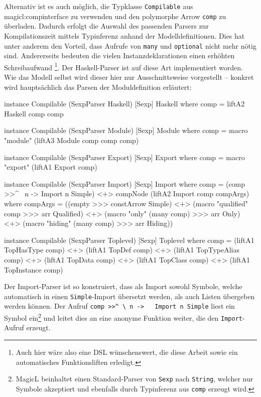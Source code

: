 \documentclass[11pt, a4paper, bibgerm]{scrbook}
\newenvironment{DIFnomarkup}{}{}
\newcommand\icode[1]{\lstinline?#1?}
\newcommand\sref{}
\begin{document}
Alternativ ist es auch möglich, die Typklasse \icode{Compilable} aus
\sref{magicl:compinterface} zu verwenden und den polymorphe
Arrow \icode{comp} zu überladen. Dadurch erfolgt die Auswahl des
passenden Parsers zur Kompilationszeit mittels Typinferenz anhand der
Modelldefinitionen. Dies hat unter anderem den Vorteil, dass Aufrufe von
\icode{many} und \icode{optional} nicht mehr nötig sind. Andererseits
bedeuten die vielen Instanzdeklarationen einen erhöhten Schreibaufwand
\footnote{Auch hier wäre also eine DSL wünschenswert, die diese Arbeit
  sowie ein automatisches Funktionsliften erledigt.}. Der Haskell-Parser
ist auf diese Art implementiert worden. Wie das Modell selbst wird
dieser hier nur Ausschnittsweise vorgestellt -- konkret wird
hauptsächlich das Parsen der Moduldefinition erläutert:
\begin{DIFnomarkup}\begin{code}
instance Compilable (SexpParser Haskell) [Sexp] Haskell where
    comp = liftA2 Haskell comp comp

instance Compilable (SexpParser Module) [Sexp] Module where
    comp = macro "module" (liftA3 Module comp comp comp)

instance Compilable (SexpParser Export) [Sexp] Export where
    comp = macro "export" (liftA1 Export comp)

instance Compilable (SexpParser Import) [Sexp] Import where
    comp  = (comp >>^ \ n -> Import n Simple) <+>
             compNode (liftA2 Import comp compArgs)
        where compArgs =
                  ((empty >>> constArrow Simple)               <+>
                   (macro "qualified" comp >>> arr Qualified)  <+>
                   (macro "only" (many comp) >>> arr Only)     <+>
                   (macro "hiding" (many comp) >>> arr Hiding))

instance Compilable (SexpParser Toplevel) [Sexp] Toplevel where
    comp = (liftA1 TopHasType comp)   <+>
           (liftA1 TopDef comp)       <+>
           (liftA1 TopTypeAlias comp) <+>
           (liftA1 TopData comp)      <+>
           (liftA1 TopClass comp)     <+>
           (liftA1 TopInstance comp)
\end{code}\end{DIFnomarkup}
Der Import-Parser ist so konstruiert, dass als Import sowohl Symbole,
welche automatisch in einen \icode{Simple}-Import übersetzt werden, als
auch Listen übergeben werden können. Der Aufruf \icode{comp >>^ \ n ->
  Import n Simple} liest ein Symbol ein\footnote{MagicL beinhaltet einen
Standard-Parser von \icode{Sexp} nach \icode{String}, welcher nur
Symbole akzeptiert und ebenfalls durch Typinferenz aus \icode{comp}
erzeugt wird.} und leitet dies an eine anonyme Funktion weiter, die den
\icode{Import}-Aufruf erzeugt.
\end{document}
